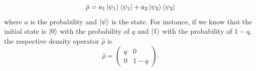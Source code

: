\documentclass[twocolumn]{article}
\begin{document}
\begin{equation} \label{eq:28}
\hat{\rho}=a_1\ket{\psi_1}\bra{\psi_1}+a_2\ket{\psi_2}\bra{\psi_2}
\end{equation}
where $a$ is the probability and $\ket{\psi}$ is the state. For instance, if we know that the initial state is $\ket{0}$ with the probability of $q$ and $\ket{1}$ with the probability of $1-q$, the respective density operator $\hat{\rho}$ is
\begin{equation} \label{eq:29}
\hat{\rho}=
\begin{pmatrix}
q & 0 \\
0 & 1-q
\end{pmatrix}.
\end{equation}
\end{document}

